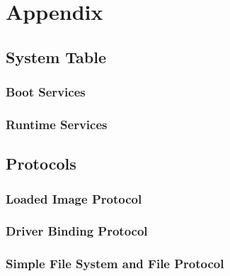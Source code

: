 
\chapter{Appendix}

\section{System Table}

\clearpage

\subsection{Boot Services}

\clearpage

\subsection{Runtime Services}

\clearpage

\section{Protocols}

\subsection{Loaded Image Protocol}


\clearpage

\subsection{Driver Binding Protocol}


\clearpage

\subsection{Simple File System and File Protocol}

